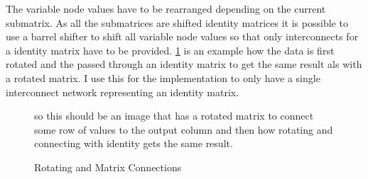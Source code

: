The variable node values have to be rearranged depending on the current submatrix. As all the submatrices are shifted identity matrices it is possible to use a barrel shifter to shift all variable node values so that only interconnects for a identity matrix have to be provided. \cref {rot_iden_same} is an example how the data is first rotated and the passed through an identity matrix to get the same result als with a rotated matrix. I use this for the implementation to only have a single interconnect network representing an identity matrix.

\begin{figure}
    so this should be an image that has a rotated matrix to connect some row of values to the output column and then how rotating and connecting with identity gets the same result.
    \centering
    \caption{Rotating and Matrix Connections}
    \label{rot_iden_same}
\end{figure}


